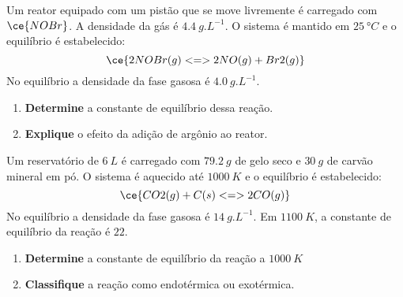 \begin{problem}[
	id={2F48},
	path={/home/braun/Documents/Developer/braunchem/data/problems/Q2/2F/2F48}
]
Um reator equipado com um pistão que se move livremente é carregado com {\(\ce{NOBr}\)}. A densidade da gás é {\(\qty{4,4}{\unit{g.L^{-1}}}\)}. O
sistema é mantido em {\(\qty{25}{\unit{\degree C}}\)} e o equilíbrio é estabelecido: {\[
    \ce{ 2 NOBr(g) <=> 2 NO(g) + Br2(g) }
\]} No equilíbrio a densidade da fase gasosa é {\(\qty{4,0}{\unit{g.L^{-1}}}\)}.

\begin{enumerate}
\def\labelenumi{\alph{enumi}.}
\tightlist
\item
  \textbf{Determine} a constante de equilíbrio dessa reação.
\item
  \textbf{Explique} o efeito da adição de argônio ao reator.
\end{enumerate}

\end{problem}


\begin{problem}[
	id={2F49},
	path={/home/braun/Documents/Developer/braunchem/data/problems/Q2/2F/2F49}
]
Um reservatório de {\(\qty{6}{\unit{L}}\)} é carregado com {\(\qty{79,2}{\unit{g}}\)} de gelo seco e {\(\qty{30}{\unit{g}}\)} de carvão mineral em pó.
O sistema é aquecido até {\(\qty{1000}{\unit{K}}\)} e o equilíbrio é estabelecido: {\[
    \ce{ CO2(g) + C(s) <=> 2 CO(g) }
\]} No equilíbrio a densidade da fase gasosa é {\(\qty{14}{\unit{g.L^{-1}}}\)}. Em {\(\qty{1100}{\unit{K}}\)}, a constante de equilíbrio da reação é
{\(22\)}.

\begin{enumerate}
\def\labelenumi{\alph{enumi}.}
\tightlist
\item
  \textbf{Determine} a constante de equilíbrio da reação a {\(\qty{1000}{\unit{K}}\)}
\item
  \textbf{Classifique} a reação como endotérmica ou exotérmica.
\end{enumerate}

\end{problem}


